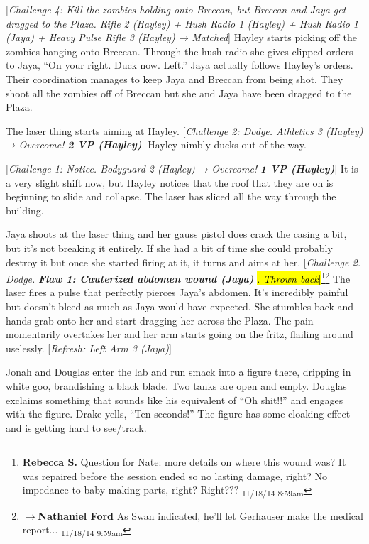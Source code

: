 {[}\textit{Challenge 4: Kill the zombies holding onto Breccan, but Breccan and Jaya get dragged to the Plaza.  Rifle 2 (Hayley) + Hush Radio 1 (Hayley) + Hush Radio 1 (Jaya) + Heavy Pulse Rifle 3 (Hayley) → Matched}{]}  Hayley starts picking off the zombies hanging onto Breccan.  Through the hush radio she gives clipped orders to Jaya, ``On your right.  Duck now.  Left.''  Jaya actually follows Hayley's orders.  Their coordination manages to keep Jaya and Breccan from being shot.  They shoot all the zombies off of Breccan but she and Jaya have been dragged to the Plaza.



The laser thing starts aiming at Hayley.  {[}\textit{Challenge 2: Dodge.  Athletics 3 (Hayley) →  Overcome! }\textit{\textbf{2 VP (Hayley)}}{]}  Hayley nimbly ducks out of the way.  

{[}\textit{Challenge 1: Notice.  Bodyguard 2 (Hayley) →  Overcome! }\textit{\textbf{1 VP (Hayley)}}{]}  It is a very slight shift now, but Hayley notices that the roof that they are on is beginning to slide and collapse.  The laser has sliced all the way through the building.



Jaya shoots at the laser thing and her gauss pistol does crack the casing a bit, but it's not breaking it entirely.  If she had a bit of time she could probably destroy it but once she started firing at it, it turns and aims at her. {[}\textit{Challenge 2. Dodge.   }\textit{\textbf{ {\color[RGB]{255,0,0}Flaw 1: Cauterized abdomen wound (Jaya)} }}\hl{\textit{.  Thrown back}{]}}\footnote{\textbf{Rebecca S. }Question for Nate: more details on where this wound was? It was repaired before the session ended so no lasting damage, right?  No impedance to baby making parts, right? Right??? \textsubscript{11/18/14 8:59am}}\footnote{$\rightarrow$\textbf{Nathaniel Ford }As Swan indicated, he'll let Gerhauser make the medical report... \textsubscript{11/18/14 9:59am}}  The laser fires a pulse that perfectly pierces Jaya's abdomen.  It's incredibly painful but doesn't bleed as much as Jaya would have expected.  She stumbles back and hands grab onto her and start dragging her across the Plaza.  The pain momentarily overtakes her and her arm starts going on the fritz, flailing around uselessly. {[}\textit{Refresh: Left Arm 3 (Jaya)}{]}





Jonah and Douglas enter the lab and run smack into a figure there, dripping in white goo, brandishing a black blade.  Two tanks are open and empty.  Douglas exclaims something that sounds like his equivalent of ``Oh shit!!'' and engages with the figure.  Drake yells, ``Ten seconds!''  The figure has some cloaking effect and is getting hard to see/track.



